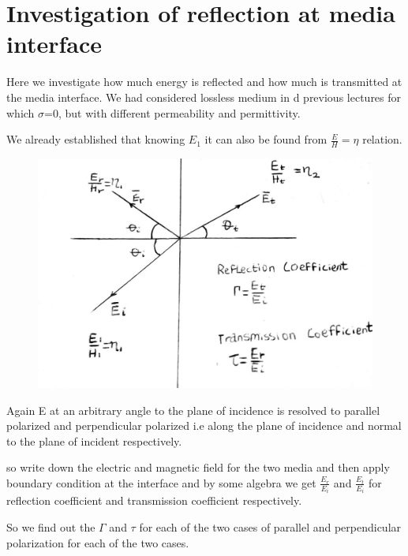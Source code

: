 \chapter{Investigation of reflection at media interface}
Here we investigate how much energy is reflected and how much is transmitted at the media interface. We had considered lossless medium in d previous lectures for which $ \sigma $=0, but with different permeability and permittivity.

We already established that knowing $E_{1}$ it can also be found from $\frac{E}{H} = \eta$ relation.
\begin{figure}[h]
\centering
\includegraphics[width=1\linewidth]{./graphics/11}
\caption{}
\label{fg:11}
\end{figure}

Again E at an arbitrary angle to the plane of incidence is resolved to parallel polarized and perpendicular polarized i.e along the plane of incidence and normal to the plane of incident respectively.

so write down the electric and magnetic field for the two media and then apply boundary condition at the interface and by some algebra we get $\frac{E_{r}}{E_{i}}$ and $\frac{E_{t}}{E_{i}}$ for reflection coefficient and transmission coefficient respectively.

So we find out the $\Gamma$ and $\tau$ for each of the two cases of parallel and perpendicular polarization for each of the two cases.

